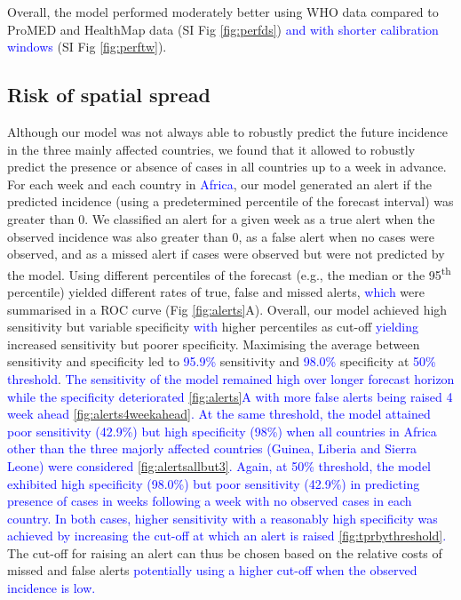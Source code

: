 \documentclass[9pt,twocolumn,twoside,lineno]{pnas-new}
\newcommand{\sangeeta}[1]{\textcolor{blue}{#1}}
\begin{document}
Overall, the model performed moderately better using WHO data compared
to ProMED and HealthMap data (SI Fig \ref{fig:perfds}) \sangeeta{and with shorter 
calibration windows} (SI Fig \ref{fig:perftw}).

\subsection*{Risk of spatial spread}
Although our model was not always able to robustly predict the future
incidence in the three mainly affected countries, we found that it
allowed to robustly predict the
presence or absence of cases in all countries up to a week in
advance. For each week and each country in \sangeeta{Africa}, our model
generated an alert if the predicted incidence (using a predetermined
percentile of the forecast interval) was greater than 0. We classified
an alert for a given week as a true
alert when the observed incidence was also greater than 0, as a false
alert when no cases were observed, and as a missed alert if cases were
observed but were not predicted by the model. Using different
percentiles of the forecast (e.g., the median or the
95\textsuperscript{th} percentile)
yielded different rates of true, false and missed alerts, \sangeeta{which} were
summarised in a ROC curve (Fig \ref{fig:alerts}A). Overall, our model 
achieved high sensitivity but variable specificity \sangeeta{with} higher
percentiles as cut-off \sangeeta{yielding} increased sensitivity but poorer
specificity. Maximising the average between
sensitivity and specificity led to \sangeeta{95.9\%} sensitivity and 
\sangeeta{98.0\%} specificity at \sangeeta{50\% threshold}. \sangeeta{The
sensitivity of the model remained high over longer forecast horizon 
while the specificity deteriorated \ref{fig:alerts}A with more false alerts being raised
4 week ahead \ref{fig:alerts4weekahead}. At the same
threshold, the model attained poor sensitivity (42.9\%) but high
specificity (98\%) when all countries in Africa other than
the three majorly affected countries (Guinea, Liberia and Sierra
Leone) were considered \ref{fig:alertsallbut3}. 
Again, at 50\% threshold, the model exhibited 
high specificity (98.0\%) but poor sensitivity (42.9\%) in predicting 
presence of cases in weeks following a week with no observed cases in each
country. In both cases, higher sensitivity with a reasonably high
specificity was achieved by increasing the cut-off at which an alert
is raised \ref{fig:tprbythreshold}.} The cut-off for raising an alert 
can thus be chosen based
on the relative costs of missed and false alerts \sangeeta{potentially
using a higher cut-off when the observed incidence is low.}
\end{document}
